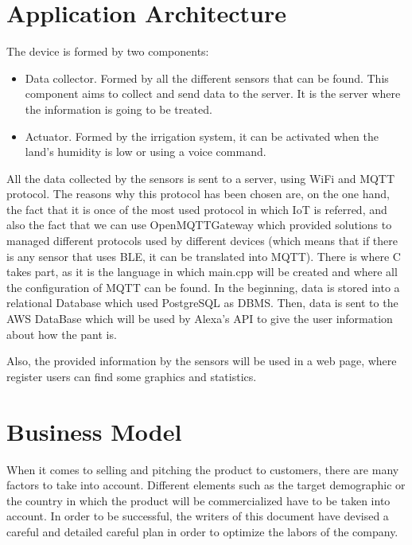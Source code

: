 \documentclass[english,runningheads,a4paper]{llncs}[2018/03/10]
\begin{document}

\section*{Application Architecture}
The device is formed by two components:
\begin{itemize}
\item Data collector. Formed by all the different sensors that can be found. This component aims to collect and send data to the server. It is the server where the information is going to be treated.
\item Actuator. Formed by the irrigation system, it can be activated when the land's humidity is low or using a voice command. 
\end{itemize}

All the data collected by the sensors is sent to a server, using WiFi and
MQTT protocol. The reasons why this protocol has been chosen are, on the 
one hand, the fact that it is once of the most used protocol in which IoT is referred,
and also the fact that we can use OpenMQTTGateway which provided 
solutions to managed different protocols used by different devices (which means that if there is any sensor that uses BLE, it can be translated into MQTT). 
There is where C takes part, as it is the language in which main.cpp will be created and where all the configuration of MQTT can be found. In the beginning,
data is stored into a relational Database which used PostgreSQL as DBMS. Then, data is sent to the AWS DataBase which will be used by Alexa's API to give
the user information about how the pant is.

Also, the provided information by the sensors will be used in a web page, where register users can find some graphics and statistics.


\section*{Business Model}

When it comes to selling and pitching the product to customers, there are many
factors to take into account. Different elements such as the target demographic
or the country in which the product will be commercialized have to be taken into
account. In order to be successful, the writers of this document have devised a
careful and detailed careful plan in order to optimize the labors of the
company.
\end{document}
